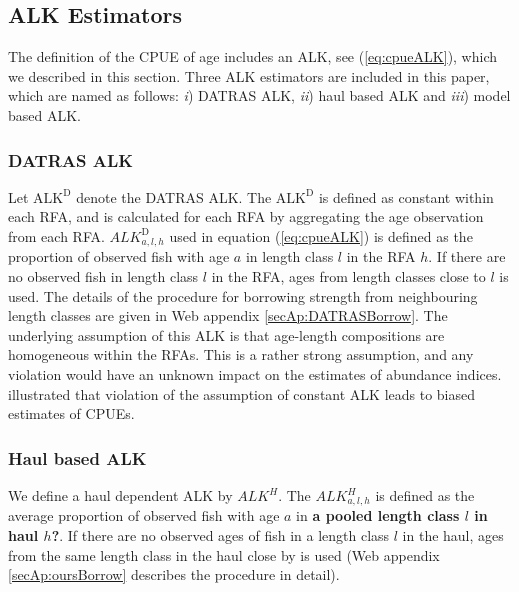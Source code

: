 \documentclass[a4paper 12pt]{article}
\numberwithin{equation}{section}
\begin{document}
 

\subsection{ALK Estimators}

The definition of the CPUE of age includes an ALK, see (\ref{eq:cpueALK}), which we described in this section. Three ALK estimators are included in this paper, which are named as follows:  \textit{i}) DATRAS ALK, \textit{ii}) haul based ALK and \textit{iii}) model based ALK.
\subsubsection{DATRAS ALK}
\label{sec:datrasalkestimator}
Let $\text{ALK}^{\text{D}}$ denote the DATRAS ALK. The $\text{ALK}^{\text{D}}$ is defined as constant within each RFA, and is calculated for each RFA by aggregating the age observation from each RFA. $ALK^{\text{D}}_{a,l,h}$ used in equation (\ref{eq:cpueALK}) is defined as the proportion of observed fish with age $a$ in length class $l$ in the RFA $h$. If there are no observed fish in length class $l$ in the RFA, ages from length classes close to $l$ is used. The details of the procedure for borrowing strength from neighbouring length classes are given in Web appendix \ref{secAp:DATRASBorrow}. The underlying assumption of this ALK  is that age-length compositions are homogeneous within the RFAs. This is a rather strong assumption, and any violation would have an unknown impact on the estimates of abundance indices. \citet{aanes2015efficient} illustrated that violation of the assumption of constant ALK leads to biased estimates of CPUEs. 

\subsubsection{Haul based ALK}
\label{sec:haulestimator}
We define a haul dependent ALK  by  $ALK^{H}$. The $ALK^{H}_{a,l,h}$ is defined as the average proportion of observed fish with age $a$ in {\bf a pooled length class $l$ in haul $h$?}. If there are no observed ages of fish in a length class $l$ in the haul, ages from the same length class in the haul close by is used (Web appendix \ref{secAp:oursBorrow} describes the procedure in detail).
\end{document}
